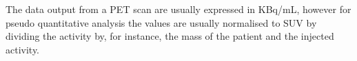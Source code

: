             The data output from a \gls{PET} scan are usually expressed in \gls{KBq/mL}, however for pseudo quantitative analysis the values are usually normalised to \gls{SUV} by dividing the activity by, for instance, the mass of the patient and the injected activity. %
        
                    
                    
            
                
                
            
